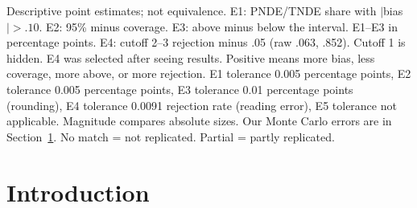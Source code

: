 {{\begin{tabular}
\bottomrule
\end{tabular}\par}
\vspace{1pt}
\noindent\parbox{\textwidth}{\raggedright Descriptive point estimates; not equivalence. E1: PNDE/TNDE share with $|$bias$|>.10$. E2: 95\% minus coverage. E3: above minus below the interval. E1--E3 in percentage points. E4: cutoff 2--3 rejection minus .05 (raw .063, .852). Cutoff 1 is hidden. E4 was selected after seeing results. Positive means more bias, less coverage, more above, or more rejection. E1 tolerance 0.005 percentage points, E2 tolerance 0.005 percentage points, E3 tolerance 0.01 percentage points (rounding), E4 tolerance 0.0091 rejection rate (reading error), E5 tolerance not applicable. Magnitude compares absolute sizes. Our Monte Carlo errors are in Section~\ref{sec:intro}. No match = not replicated. Partial = partly replicated.}
}

\setcounter{table}{1}

\section{Introduction}\label{sec:intro}

